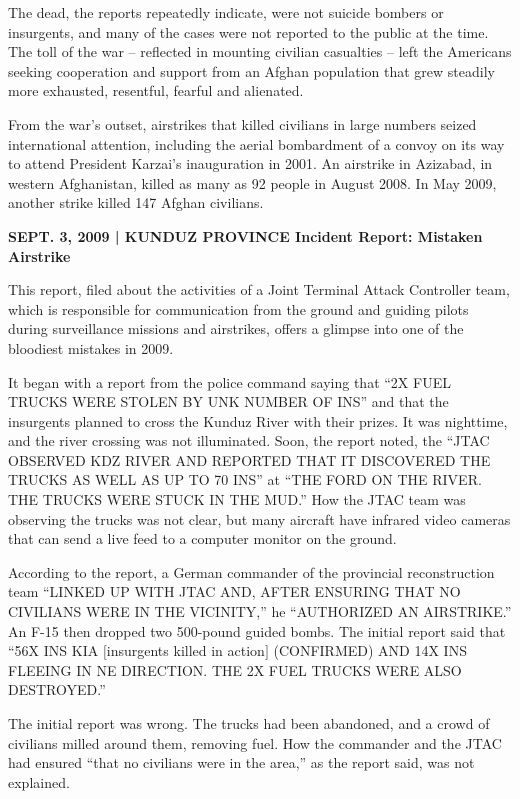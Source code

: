 ﻿\documentclass[12pt]{article}
\begin{document}
The dead, the reports repeatedly indicate, were not suicide bombers or insurgents, and many of the
cases were not reported to the public at the time. The toll of the war -- reflected in mounting
civilian casualties -- left the Americans seeking cooperation and support from an Afghan population
that grew steadily more exhausted, resentful, fearful and alienated.

From the war's outset, airstrikes that killed civilians in large numbers seized international
attention, including the aerial bombardment of a convoy on its way to attend President Karzai's
inauguration in 2001. An airstrike in Azizabad, in western Afghanistan, killed as many as 92 people
in August 2008. In May 2009, another strike killed 147 Afghan civilians.

\textbf{SEPT. 3, 2009 | KUNDUZ PROVINCE Incident Report: Mistaken Airstrike}

This report, filed about the activities of a Joint Terminal Attack Controller team, which is
responsible for communication from the ground and guiding pilots during surveillance missions and
airstrikes, offers a glimpse into one of the bloodiest mistakes in 2009.

It began with a report from the police command saying that ``2X FUEL TRUCKS WERE STOLEN BY UNK
NUMBER OF INS'' and that the insurgents planned to cross the Kunduz River with their prizes. It was
nighttime, and the river crossing was not illuminated. Soon, the report noted, the ``JTAC OBSERVED
KDZ RIVER AND REPORTED THAT IT DISCOVERED THE TRUCKS AS WELL AS UP TO 70 INS'' at ``THE FORD ON THE
RIVER. THE TRUCKS WERE STUCK IN THE MUD.'' How the JTAC team was observing the trucks was not clear,
but many aircraft have infrared video cameras that can send a live feed to a computer monitor on the
ground.

According to the report, a German commander of the provincial reconstruction team ``LINKED UP WITH
JTAC AND, AFTER ENSURING THAT NO CIVILIANS WERE IN THE VICINITY,'' he ``AUTHORIZED AN AIRSTRIKE.''
An F-15 then dropped two 500-pound guided bombs. The initial report said that ``56X INS KIA
$[$insurgents killed in action$]$ (CONFIRMED) AND 14X INS FLEEING IN NE DIRECTION. THE 2X FUEL
TRUCKS WERE ALSO DESTROYED.''

The initial report was wrong. The trucks had been abandoned, and a crowd of civilians milled around
them, removing fuel. How the commander and the JTAC had ensured ``that no civilians were in the
area,'' as the report said, was not explained.
\end{document}

